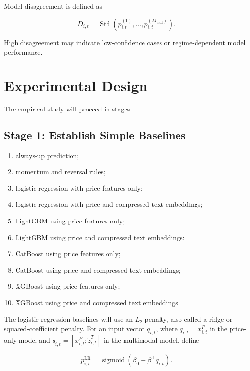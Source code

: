 \documentclass[11pt]{article}
\newcommand{\sigmoid}{\operatorname{sigmoid}}
\begin{document}
Model disagreement is defined as

\begin{equation}
D_{i,t}
=
\operatorname{Std}
\left(
p^{(1)}_{i,t},
\ldots,
p^{(M_{\mathrm{mod}})}_{i,t}
\right).
\end{equation}

High disagreement may indicate low-confidence cases or regime-dependent model
performance.

\section{Experimental Design}

The empirical study will proceed in stages.

\subsection{Stage 1: Establish Simple Baselines}

\begin{enumerate}
    \item always-up prediction;
    \item momentum and reversal rules;
    \item logistic regression with price features only;
    \item logistic regression with price and compressed text embeddings;
    \item LightGBM using price features only;
    \item LightGBM using price and compressed text embeddings;
    \item CatBoost using price features only;
    \item CatBoost using price and compressed text embeddings;
    \item XGBoost using price features only;
    \item XGBoost using price and compressed text embeddings.
\end{enumerate}

The logistic-regression baselines will use an $L_2$ penalty, also called a
ridge or squared-coefficient penalty.  For an input vector $q_{i,t}$, where
$q_{i,t}=x^P_{i,t}$ in the price-only model and
$q_{i,t}=[x^P_{i,t};\widetilde z^T_{i,t}]$ in the multimodal model, define

\begin{equation}
p^{\mathrm{LR}}_{i,t}
=
\sigmoid\left(
\beta_0+\beta^\top q_{i,t}
\right).
\end{equation}
\end{document}
